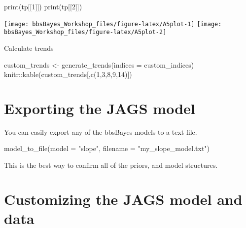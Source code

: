 \documentclass[
]{book}
\newenvironment{Shaded}{\begin{snugshade}}{\end{snugshade}}
\newcommand{\AttributeTok}[1]{\textcolor[rgb]{0.77,0.63,0.00}{#1}}
\newcommand{\DecValTok}[1]{\textcolor[rgb]{0.00,0.00,0.81}{#1}}
\newcommand{\FunctionTok}[1]{\textcolor[rgb]{0.00,0.00,0.00}{#1}}
\newcommand{\NormalTok}[1]{#1}
\newcommand{\OtherTok}[1]{\textcolor[rgb]{0.56,0.35,0.01}{#1}}
\newcommand{\SpecialCharTok}[1]{\textcolor[rgb]{0.00,0.00,0.00}{#1}}
\newcommand{\StringTok}[1]{\textcolor[rgb]{0.31,0.60,0.02}{#1}}
\begin{document}
\begin{Shaded}
\begin{Highlighting}[]
\FunctionTok{print}\NormalTok{(tp[[}\DecValTok{1}\NormalTok{]])}
\FunctionTok{print}\NormalTok{(tp[[}\DecValTok{2}\NormalTok{]])}
\end{Highlighting}
\end{Shaded}

\begin{center}\texttt{[image: bbsBayes\_Workshop\_files/figure-latex/A5plot-1]} \texttt{[image: bbsBayes\_Workshop\_files/figure-latex/A5plot-2]} \end{center}

Calculate trends

\begin{Shaded}
\begin{Highlighting}[]
\NormalTok{custom\_trends }\OtherTok{\textless{}{-}} \FunctionTok{generate\_trends}\NormalTok{(}\AttributeTok{indices =}\NormalTok{ custom\_indices)}
\NormalTok{knitr}\SpecialCharTok{::}\FunctionTok{kable}\NormalTok{(custom\_trends[,}\FunctionTok{c}\NormalTok{(}\DecValTok{1}\NormalTok{,}\DecValTok{3}\NormalTok{,}\DecValTok{8}\NormalTok{,}\DecValTok{9}\NormalTok{,}\DecValTok{14}\NormalTok{)])}
\end{Highlighting}
\end{Shaded}

\hypertarget{exporting-the-jags-model}{%
\section{Exporting the JAGS model}\label{exporting-the-jags-model}}

You can easily export any of the bbsBayes models to a text file.

\begin{Shaded}
\begin{Highlighting}[]
\FunctionTok{model\_to\_file}\NormalTok{(}\AttributeTok{model =} \StringTok{"slope"}\NormalTok{,}
              \AttributeTok{filename =} \StringTok{"my\_slope\_model.txt"}\NormalTok{)}
\end{Highlighting}
\end{Shaded}

This is the best way to confirm all of the priors, and model structures.

\hypertarget{customizing-the-jags-model-and-data}{%
\section{Customizing the JAGS model and data}\label{customizing-the-jags-model-and-data}}
\end{document}
